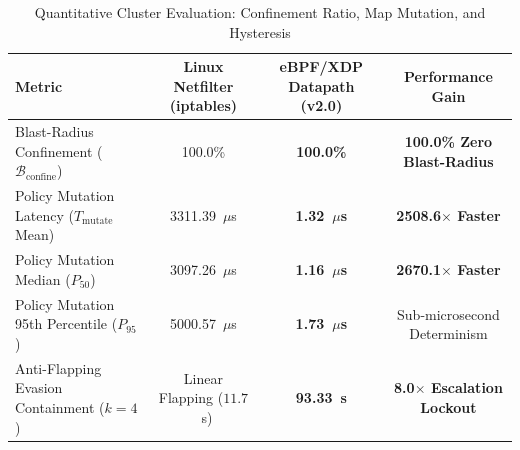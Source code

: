 \begin{table}[htbp]
\centering
\caption{Quantitative Cluster Evaluation: Confinement Ratio, Map Mutation, and Hysteresis}
\label{tab:cluster_benchmarks}
\begin{tabular}{|l|c|c|c|}
\hline
\textbf{Metric} & \textbf{Linux Netfilter (iptables)} & \textbf{eBPF/XDP Datapath (v2.0)} & \textbf{Performance Gain} \\
\hline
Blast-Radius Confinement ($\mathcal{B}_{\text{confine}}$) & 100.0\% & \textbf{100.0\%} & \textbf{100.0\% Zero Blast-Radius} \\
Policy Mutation Latency ($T_{\text{mutate}}$ Mean) & 3311.39~$\mu$s & \textbf{1.32~$\mu$s} & \textbf{2508.6$\times$ Faster} \\
Policy Mutation Median ($P_{50}$) & 3097.26~$\mu$s & \textbf{1.16~$\mu$s} & \textbf{2670.1$\times$ Faster} \\
Policy Mutation 95th Percentile ($P_{95}$) & 5000.57~$\mu$s & \textbf{1.73~$\mu$s} & Sub-microsecond Determinism \\
Anti-Flapping Evasion Containment ($k=4$) & Linear Flapping ($11.7$~s) & \textbf{93.33~s} & \textbf{8.0$\times$ Escalation Lockout} \\
\hline
\end{tabular}
\end{table}
